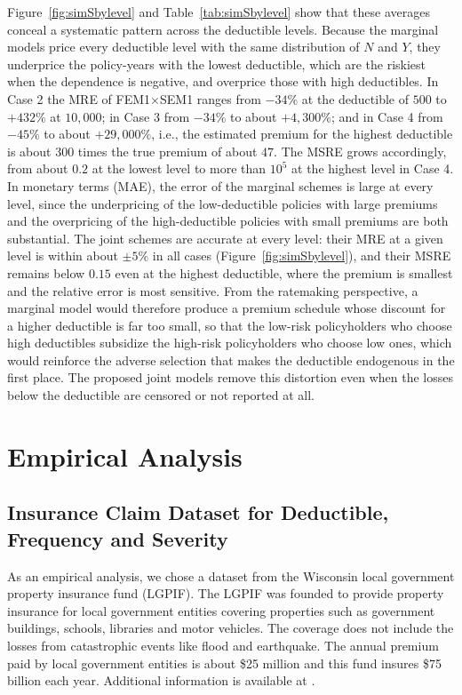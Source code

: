 \documentclass[11pt]{article}
\newcommand{\rev}[1]{{\color{blue}#1}}
\begin{document}
\rev{Figure~\ref{fig:simSbylevel} and Table~\ref{tab:simSbylevel} show that these averages conceal a systematic pattern across the deductible levels. Because the marginal models price every deductible level with the same distribution of $N$ and $Y$, they underprice the policy-years with the lowest deductible, which are the riskiest when the dependence is negative, and overprice those with high deductibles. In Case 2 the MRE of FEM1$\times$SEM1 ranges from $-34\%$ at the deductible of $500$ to $+432\%$ at $10{,}000$; in Case 3 from $-34\%$ to about $+4{,}300\%$; and in Case 4 from $-45\%$ to about $+29{,}000\%$, i.e., the estimated premium for the highest deductible is about $300$ times the true premium of about $47$. The MSRE grows accordingly, from about $0.2$ at the lowest level to more than $10^5$ at the highest level in Case 4. In monetary terms (MAE), the error of the marginal schemes is large at every level, since the underpricing of the low-deductible policies with large premiums and the overpricing of the high-deductible policies with small premiums are both substantial. The joint schemes are accurate at every level: their MRE at a given level is within about $\pm 5\%$ in all cases (Figure~\ref{fig:simSbylevel}), and their MSRE remains below $0.15$ even at the highest deductible, where the premium is smallest and the relative error is most sensitive. From the ratemaking perspective, a marginal model would therefore produce a premium schedule whose discount for a higher deductible is far too small, so that the low-risk policyholders who choose high deductibles subsidize the high-risk policyholders who choose low ones, which would reinforce the adverse selection that makes the deductible endogenous in the first place. The proposed joint models remove this distortion even when the losses below the deductible are censored or not reported at all.}


\FloatBarrier

\section{Empirical Analysis}\label{sec:empirical}
\subsection{Insurance Claim Dataset for Deductible, Frequency and Severity}

As an empirical analysis, we chose a dataset from the Wisconsin local government property insurance fund (LGPIF). The LGPIF was founded to provide property insurance for local government entities covering properties such as government buildings, schools, libraries and motor vehicles. The coverage does not include the losses from catastrophic events like flood and earthquake. The annual premium paid by local government entities is about \$25 million and this fund insures \$75  billion each year. Additional information is \rev{available at} \cite{lgpifwebpage}. \\
\end{document}

